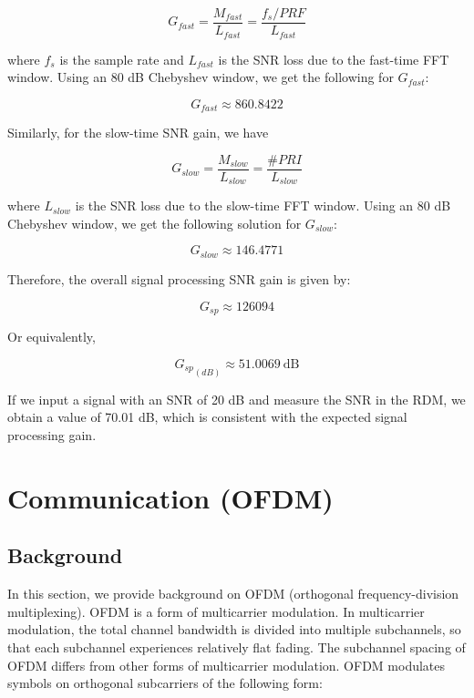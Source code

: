 \documentclass[conference]{IEEEtran}
\begin{document}
	\begin{equation}
		 G_{fast} = \frac{M_{fast}}{L_{fast}} = \frac{f_s/PRF}{L_{fast}}
		 \label{eq::fmcw_fast_time_snr_gain}
	\end{equation}
		
	where $f_s$ is the sample rate and $L_{fast}$ is the SNR loss due to the fast-time FFT window. Using an 80 dB Chebyshev window, we get the following for $G_{fast}$:
	
	\begin{equation}
		G_{fast} \approx 860.8422
	\end{equation}
	
	Similarly, for the slow-time SNR gain, we have
	
	\begin{equation}
		G_{slow} = \frac{M_{slow}}{L_{slow}} = \frac{\#PRI}{L_{slow}}
	\end{equation}
		
	where $L_{slow}$ is the SNR loss due to the slow-time FFT window. Using an 80 dB Chebyshev window, we get the following solution for $G_{slow}$:
	
	\begin{equation}
		G_{slow} \approx 146.4771
	\end{equation}
	
	Therefore, the overall signal processing SNR gain is given by:
	
	\begin{equation}
		G_{sp} \approx 126094
	\end{equation}
	
	Or equivalently,
	
	\begin{equation}
		 {G_{sp}}_{(dB)} \approx 51.0069\ \text{dB}
	\end{equation}
	
	If we input a signal with an SNR of 20 dB and measure the SNR in the RDM, we obtain a value of 70.01 dB, which is consistent with the expected signal processing gain.
		
     \section {Communication (OFDM)}
     
	 \subsection {Background}
	 
	 	In this section, we provide background on OFDM (orthogonal frequency-division multiplexing). OFDM is a form of multicarrier modulation. In multicarrier modulation, the total channel bandwidth is divided into multiple subchannels, so that each subchannel experiences relatively flat fading. The subchannel spacing of OFDM differs from other forms of multicarrier modulation. OFDM modulates symbols on orthogonal subcarriers of the following form:
	 	
\end{document}
